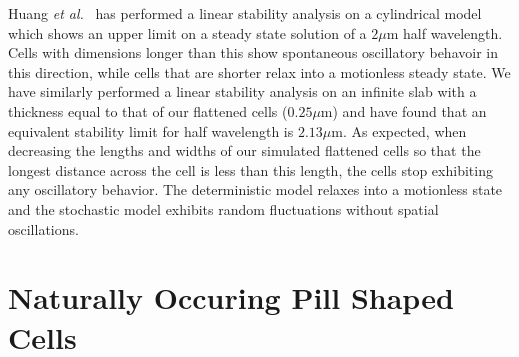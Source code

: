 \documentclass{pnastwo}
\newcommand\micron{\ensuremath{\mu\text{m}}}
\begin{document}
\begin{article}

Huang \emph{et al.}~\cite{huang2003dynamic} has performed a linear
stability analysis on a cylindrical model which shows an upper limit
on a steady state solution of a $2\micron$ half wavelength.  Cells
with dimensions longer than this show spontaneous oscillatory behavoir
in this direction, while cells that are shorter relax into a
motionless steady state.  We have similarly performed a linear
stability analysis on an infinite slab with a thickness equal to that
of our flattened cells ($0.25\micron$) and have found that an
equivalent stability limit for half wavelength is $2.13\micron$. As
expected, when decreasing the lengths and widths of our simulated
flattened cells so that the longest distance across the cell is less
than this length, the cells stop exhibiting any oscillatory behavior.
The deterministic model relaxes into a motionless state and the
stochastic model exhibits random fluctuations without spatial
oscillations.

\section{Naturally Occuring Pill Shaped Cells}


\end{article}
\end{document}
